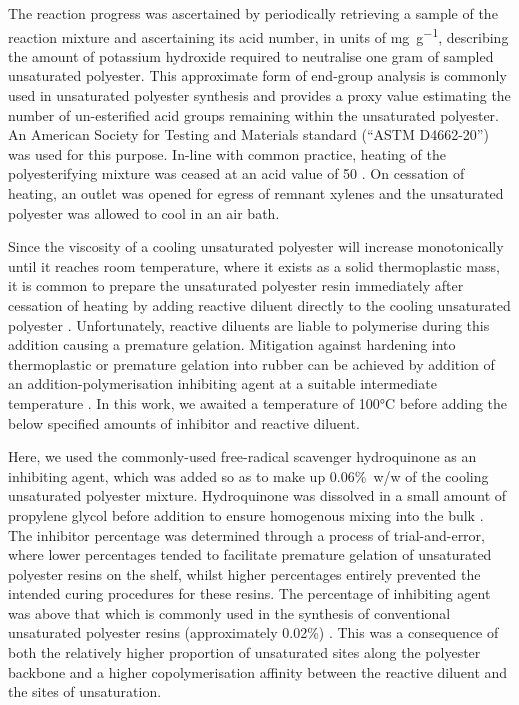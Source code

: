 The reaction progress was ascertained by periodically retrieving a sample of the
 reaction mixture and ascertaining its acid number, in units of
 \unit{\milli\gram\per\gram}, describing the amount of potassium hydroxide
 required to neutralise one gram of sampled unsaturated polyester.
This approximate form of end-group analysis is commonly used in unsaturated
 polyester synthesis \autocite{Pantic2022,Spasojevic2021,Costa2017,Parkyn1967}
 and provides a proxy value estimating the number of un-esterified acid
 groups remaining within the unsaturated polyester.
An American Society for Testing and Materials standard (``ASTM D4662-20'')
 was used for this purpose.
In-line with common practice, heating of the polyesterifying mixture was
 ceased at an acid value of 50 \autocite{Parkyn1967,Bodnar1990,Korbar1993}.
On cessation of heating, an outlet was opened for egress of remnant xylenes
 and the unsaturated polyester was allowed to cool in an air bath.

Since the viscosity of a cooling unsaturated polyester will increase 
 monotonically until it reaches room temperature, where it exists as a
 solid thermoplastic mass, it is common to prepare the unsaturated
 polyester resin immediately after cessation of heating by adding
 reactive diluent directly to the cooling unsaturated polyester
 \autocite{Parkyn1967}.
Unfortunately, reactive diluents are liable to
 polymerise during this addition causing a premature gelation.
Mitigation against hardening into thermoplastic or
 premature gelation into rubber can be achieved by addition of an 
 addition-polymerisation inhibiting agent at a suitable intermediate
 temperature \autocite{Parkyn1967,Ahamad2001,Cherian2004}.
In this work, we awaited a temperature of 100\unit{\degreeCelsius} before 
 adding the below specified amounts of inhibitor and reactive diluent.

Here, we used the commonly-used free-radical scavenger hydroquinone
 as an inhibiting agent, which was added so as to make up
 0.06\unit{\percent}~w/w of the cooling unsaturated polyester mixture.
Hydroquinone was dissolved in a small amount of propylene glycol before
 addition to ensure homogenous mixing into the bulk
 \autocite{Parkyn1967}.
The inhibitor percentage was determined through a process of
 trial-and-error, where lower percentages tended to facilitate premature
 gelation of unsaturated polyester resins on the shelf, whilst higher
 percentages entirely prevented the intended curing procedures for these 
 resins.
The percentage of inhibiting agent was above that which is
 commonly used in the synthesis of conventional unsaturated polyester
 resins (approximately 0.02\unit{\percent}) \autocite{Parkyn1967,Cherian2004}.
This was a consequence of both the relatively higher proportion of
 unsaturated sites along the polyester backbone and a higher copolymerisation
 affinity between the reactive diluent and the sites of unsaturation.

